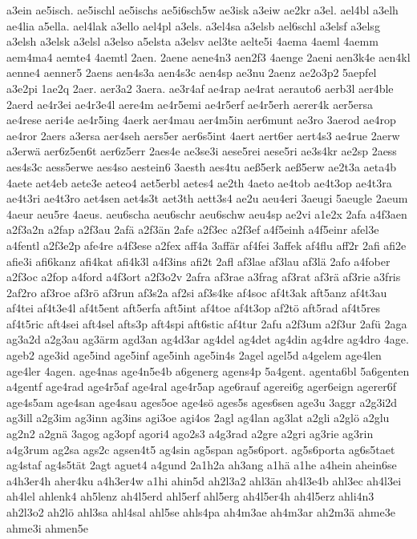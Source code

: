 {a3ein
ae5isch.
ae5ischl
ae5ischs
ae5i6sch5w
ae3isk
a3eiw
ae2kr
a3el.
ael4bl
a3elh
ae4lia
a5ella.
ael4lak
a3ello
ael4pl
a3els.
a3el4sa
a3elsb
ael6schl
a3elsf
a3elsg
a3elsh
a3elsk
a3elsl
a3elso
a5elsta
a3elsv
ael3te
aelte5i
4aema
4aeml
4aemm
aem4ma4
aemte4
4aemtl
2aen.
2aene
aene4n3
aen2f3
4aenge
2aeni
aen3k4e
aen4kl
aenne4
aenner5
2aens
aen4s3a
aen4s3c
aen4sp
ae3nu
2aenz
ae2o3p2
5aepfel
a3e2pi
1ae2q
2aer.
aer3a2
3aera.
ae3r4af
ae4rap
ae4rat
aerauto6
aerb3l
aer4ble
2aerd
ae4r3ei
ae4r3e4l
aere4m
ae4r5emi
ae4r5erf
ae4r5erh
aerer4k
aer5ersa
ae4rese
aeri4e
ae4r5ing
4aerk
aer4mau
aer4m5in
aer6munt
ae3ro
3aerod
ae4rop
ae4ror
2aers
a3ersa
aer4seh
aers5er
aer6s5int
4aert
aert6er
aert4s3
ae4rue
2aerw
a3erwä
aer6z5en6t
aer6z5err
2aes4e
ae3se3i
aese5rei
aese5ri
ae3s4kr
ae2sp
2aess
aes4s3c
aess5erwe
aes4so
aestein6
3aesth
aes4tu
aeß5erk
aeß5erw
ae2t3a
aeta4b
4aete
aet4eb
aete3e
aeteo4
aet5erbl
aetes4
ae2th
4aeto
ae4tob
ae4t3op
ae4t3ra
ae4t3ri
ae4t3ro
aet4sen
aet4s3t
aet3th
aett3s4
ae2u
aeu4eri
3aeugi
5aeugle
2aeum
4aeur
aeu5re
4aeus.
aeu6scha
aeu6schr
aeu6schw
aeu4sp
ae2vi
a1e2x
2afa
a4f3aen
a2f3a2n
a2fap
a2f3au
2afä
a2f3än
2afe
a2f3ec
a2f3ef
a4f5einh
a4f5einr
afel3e
a4fentl
a2f3e2p
afe4re
a4f3ese
a2fex
aff4a
3affär
af4fei
3affek
af4flu
aff2r
2afi
afi2e
afie3i
afi6kanz
afi4kat
afi4k3l
a4f3ins
afi2t
2afl
af3lae
af3lau
af3lä
2afo
a4fober
a2f3oc
a2fop
a4ford
a4f3ort
a2f3o2v
2afra
af3rae
a3frag
af3rat
af3rä
af3rie
a3fris
2af2ro
af3roe
af3rö
af3run
af3s2a
af2si
af3s4ke
af4soc
af4t3ak
aft5anz
af4t3au
af4tei
af4t3e4l
af4t5ent
aft5erfa
aft5int
af4toe
af4t3op
af2tö
aft5rad
af4t5res
af4t5ric
aft4sei
aft4sel
afts3p
aft4spi
aft6stic
af4tur
2afu
a2f3um
a2f3ur
2afü
2aga
ag3a2d
a2g3au
ag3ärm
agd3an
ag4d3ar
ag4del
ag4det
ag4din
ag4dre
ag4dro
4age.
ageb2
age3id
age5ind
age5inf
age5inh
age5in4s
2agel
agel5d
a4gelem
age4len
age4ler
4agen.
age4nas
age4n5e4b
a6generg
agens4p
5a4gent.
agenta6bl
5a6genten
a4gentf
age4rad
age4r5af
age4ral
age4r5ap
age6rauf
agerei6g
ager6eign
agerer6f
age4s5am
age4san
age4sau
ages5oe
age4sö
ages5s
ages6sen
age3u
3aggr
a2g3i2d
ag3ill
a2g3im
ag3inn
ag3ins
agi3oe
agi4os
2agl
ag4lan
ag3lat
a2gli
a2glö
a2glu
ag2n2
a2gnä
3agog
ag3opf
agori4
ago2s3
a4g3rad
a2gre
a2gri
ag3rie
ag3rin
a4g3rum
ag2sa
ags2c
agsen4t5
ag4sin
ag5span
ag5s6port.
ag5s6porta
ag6s5taet
ag4staf
ag4s5tät
2agt
aguet4
a4gund
2a1h2a
ah3ang
a1hä
a1he
a4hein
ahein6se
a4h3er4h
aher4ku
a4h3er4w
a1hi
ahin5d
ah2l3a2
ahl3än
ah4l3e4b
ahl3ec
ah4l3ei
ah4lel
ahlenk4
ah5lenz
ah4l5erd
ahl5erf
ahl5erg
ah4l5er4h
ah4l5erz
ahli4n3
ah2l3o2
ah2lö
ahl3sa
ahl4sal
ahl5se
ahls4pa
ah4m3ae
ah4m3ar
ah2m3ä
ahme3e
ahme3i
ahmen5e
}
